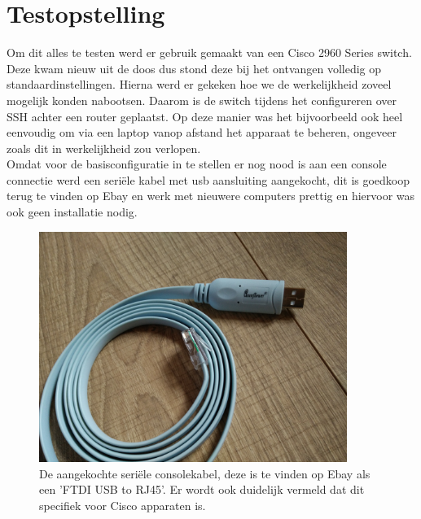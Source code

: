 
\chapter{Testopstelling}
\label{ch:testopstelling}

Om dit alles te testen werd er gebruik gemaakt van een Cisco 2960 Series switch. Deze kwam nieuw uit de doos dus stond deze bij het ontvangen volledig op standaardinstellingen. Hierna werd er gekeken hoe we de werkelijkheid zoveel mogelijk konden nabootsen. Daarom is de switch tijdens het configureren over SSH achter een router geplaatst. Op deze manier was het bijvoorbeeld ook heel eenvoudig om via een laptop vanop afstand het apparaat te beheren, ongeveer zoals dit in werkelijkheid zou verlopen.
\\

Omdat voor de basisconfiguratie in te stellen er nog nood is aan een console connectie werd een seriële kabel met usb aansluiting aangekocht, dit is goedkoop terug te vinden op Ebay en werk met nieuwere computers prettig en hiervoor was ook geen installatie nodig. 

\begin{figure}[H]
\centering
\includegraphics[width=10cm]{../img/serialcable}
\caption{De aangekochte seriële consolekabel, deze is te vinden op Ebay als een 'FTDI USB to RJ45'. Er wordt ook duidelijk vermeld dat dit specifiek voor Cisco apparaten is. }
\end{figure}

